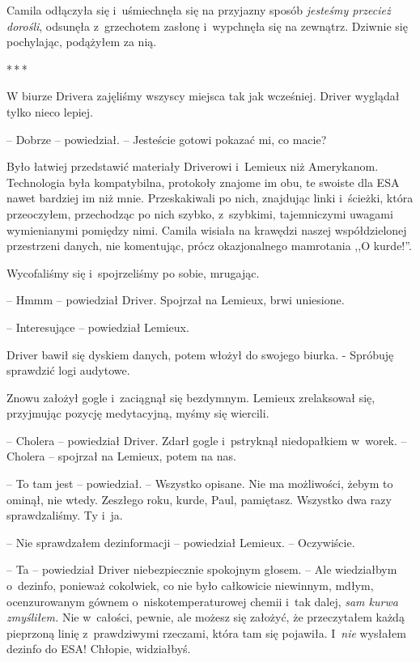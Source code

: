\documentclass[oneside,polish,12pt,sfheadings]{mwbk}
\newcommand{\threeast}{\bigskip\par\centerline{*\,*\,*}\medskip\par}%
\begin{document}
Camila odłączyła się i~uśmiechnęła się na przyjazny sposób
\emph{jesteśmy przecież dorośli}, odsunęła z~grzechotem zasłonę i~wypchnęła się na zewnątrz. Dziwnie się pochylając, podążyłem za nią.

\threeast

W biurze Drivera zajęliśmy wszyscy miejsca tak jak wcześniej. Driver
wyglądał tylko nieco lepiej.

-- Dobrze -- powiedział. -- Jesteście gotowi pokazać mi, co macie?

Było łatwiej przedstawić materiały Driverowi i~Lemieux niż Amerykanom.
Technologia była kompatybilna, protokoły znajome im obu, te swoiste dla
ESA nawet bardziej im niż mnie. Przeskakiwali po nich, znajdując linki i~ścieżki, która przeoczyłem, przechodząc po nich szybko, z~szybkimi,
tajemniczymi uwagami wymienianymi pomiędzy nimi. Camila wisiała na
krawędzi naszej współdzielonej przestrzeni danych, nie komentując, prócz
okazjonalnego mamrotania ,,O kurde!''.

Wycofaliśmy się i~spojrzeliśmy po sobie, mrugając.

-- Hmmm -- powiedział Driver. Spojrzał na Lemieux, brwi uniesione.

-- Interesujące -- powiedział Lemieux.

Driver bawił się dyskiem danych, potem włożył do swojego biurka. -
Spróbuję sprawdzić logi audytowe.

Znowu założył gogle i~zaciągnął się bezdymnym. Lemieux zrelaksował się,
przyjmując pozycję medytacyjną, myśmy się wiercili.

-- Cholera -- powiedział Driver. Zdarł gogle i~pstryknął niedopałkiem w~worek. -- Cholera -- spojrzał na Lemieux, potem na nas.

-- To tam jest -- powiedział. -- Wszystko opisane. Nie ma możliwości, żebym
to ominął, nie wtedy. Zeszłego roku, kurde, Paul, pamiętasz. Wszystko
dwa razy sprawdzaliśmy. Ty i~ja.

-- Nie sprawdzałem dezinformacji -- powiedział Lemieux. -- Oczywiście.

-- Ta -- powiedział Driver niebezpiecznie spokojnym głosem. -- Ale
wiedziałbym o~dezinfo, ponieważ cokolwiek, co nie było całkowicie
niewinnym, mdłym, ocenzurowanym gównem o~niskotemperaturowej chemii i~tak dalej, \emph{sam kurwa zmyśliłem.} Nie w~całości, pewnie, ale
możesz się założyć, że przeczytałem każdą pieprzoną linię z~prawdziwymi
rzeczami, która tam się pojawiła. I~\emph{nie} wysłałem dezinfo do ESA!
Chłopie, widziałbyś.
\end{document}
